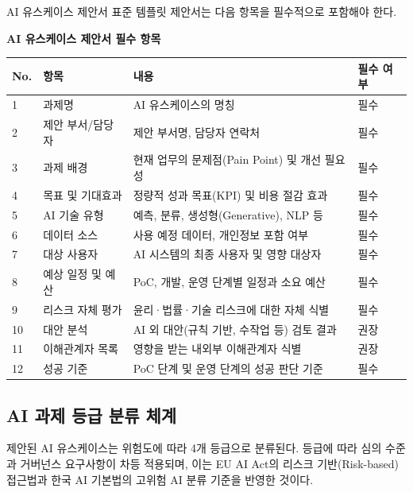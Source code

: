 \begin{practicaltool}{AI 유스케이스 제안서 표준 템플릿}
제안서는 다음 항목을 필수적으로 포함해야 한다.

\textbf{AI 유스케이스 제안서 필수 항목}

\begin{tabularx}{\textwidth}{p{0.5cm}p{3cm}Xp{2cm}}
\toprule
\textbf{No.} & \textbf{항목} & \textbf{내용} & \textbf{필수 여부} \\
\midrule
1 & 과제명 & AI 유스케이스의 명칭 & 필수 \\
2 & 제안 부서/담당자 & 제안 부서명, 담당자 연락처 & 필수 \\
3 & 과제 배경 & 현재 업무의 문제점(Pain Point) 및 개선 필요성 & 필수 \\
4 & 목표 및 기대효과 & 정량적 성과 목표(KPI) 및 비용 절감 효과 & 필수 \\
5 & AI 기술 유형 & 예측, 분류, 생성형(Generative), NLP 등 & 필수 \\
6 & 데이터 소스 & 사용 예정 데이터, 개인정보 포함 여부 & 필수 \\
7 & 대상 사용자 & AI 시스템의 최종 사용자 및 영향 대상자 & 필수 \\
8 & 예상 일정 및 예산 & PoC, 개발, 운영 단계별 일정과 소요 예산 & 필수 \\
9 & 리스크 자체 평가 & 윤리·법률·기술 리스크에 대한 자체 식별 & 필수 \\
10 & 대안 분석 & AI 외 대안(규칙 기반, 수작업 등) 검토 결과 & 권장 \\
11 & 이해관계자 목록 & 영향을 받는 내외부 이해관계자 식별 & 권장 \\
12 & 성공 기준 & PoC 단계 및 운영 단계의 성공 판단 기준 & 필수 \\
\bottomrule
\end{tabularx}
\end{practicaltool}

\subsection{AI 과제 등급 분류 체계}
\label{sec:8.2.2}

제안된 AI 유스케이스는 위험도에 따라 4개 등급으로 분류된다. 등급에 따라 심의 수준과 거버넌스 요구사항이 차등 적용되며, 이는 EU AI Act의 리스크 기반(Risk-based) 접근법과 한국 AI 기본법의 고위험 AI 분류 기준을 반영한 것이다.

